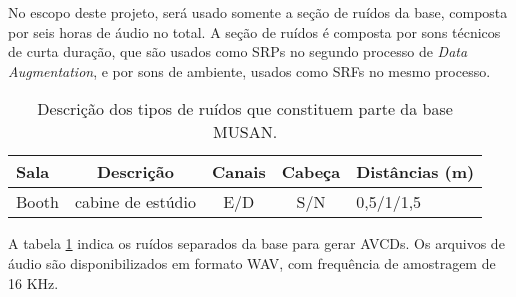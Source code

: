 No escopo deste projeto, será usado somente a seção de ruídos da base, composta por seis horas de áudio no total.
A seção de ruídos é composta por sons técnicos de curta duração, que são usados como SRPs no segundo processo de 
\textit{Data Augmentation}, e por sons de ambiente, usados como SRFs no mesmo processo.

\begin{table} [H]
    \centering
    \caption{Descrição dos tipos de ruídos que constituem parte da base MUSAN.}
    \label{tbl:noise}
    \begin{tabular}{l|c|c|c|l}
        
        \textbf{Sala} & \textbf{Descrição} & \textbf{Canais} & \textbf{Cabeça} & \textbf{Distâncias (m)} \\
        \hline 

        Booth & cabine de estúdio & E/D & S/N & 0,5/1/1,5 \\

    \end{tabular}
\end{table}

A tabela \ref{tbl:noise} indica os ruídos separados da base para gerar AVCDs.
Os arquivos de áudio são disponibilizados em formato WAV, com frequência de amostragem de 16 KHz. 